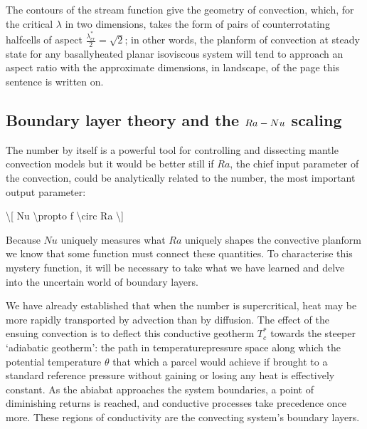 \documentclass[letterpaper,10pt,english]{jupyterBook}
\begin{document}
\sphinxAtStartPar
The contours of the stream function give the geometry of convection, which, for the critical \(\lambda\) in two dimensions, takes the form of pairs of counter\sphinxhyphen{}rotating half\sphinxhyphen{}cells of aspect \(\frac{\lambda_{cr}^*}{2}=\sqrt{2}\); in other words, the planform of convection at steady state for any basally\sphinxhyphen{}heated planar isoviscous system will tend to approach an aspect ratio with the approximate dimensions, in landscape, of the page this sentence is written on.


\subsection{Boundary layer theory and the \protect\(Ra-Nu\protect\) scaling}
\label{\detokenize{content/chapter_02_methods/section1:boundary-layer-theory-and-the-ra-nu-scaling}}
\sphinxAtStartPar
The  number by itself is a powerful tool for controlling and dissecting mantle convection models \sphinxhyphen{} but it would be better still if \(Ra\), the chief input parameter of the convection, could be analytically related to the  number, the most important output parameter:

\sphinxAtStartPar
\textbackslash{}{[} Nu \textbackslash{}propto f \textbackslash{}circ Ra \textbackslash{}{]}

\sphinxAtStartPar
Because \(Nu\) uniquely measures what \(Ra\) uniquely shapes \sphinxhyphen{} the convective planform \sphinxhyphen{} we know that some function must connect these quantities. To characterise this mystery function, it will be necessary to take what we have learned and delve into the uncertain world of boundary layers.

\sphinxAtStartPar
We have already established that when the  number is supercritical, heat may be more rapidly transported by advection than by diffusion. The effect of the ensuing convection is to deflect this conductive geotherm \(T_c^*\) towards the steeper ‘adiabatic geotherm’: the path in temperature\sphinxhyphen{}pressure space along which the potential temperature \(\theta\) \sphinxhyphen{} that which a parcel would achieve if brought to a standard reference pressure without gaining or losing any heat \sphinxhyphen{} is effectively constant. As the abiabat approaches the system boundaries, a point of diminishing returns is reached, and conductive processes take precedence once more. These regions of conductivity are the convecting system’s boundary layers.
\end{document}
